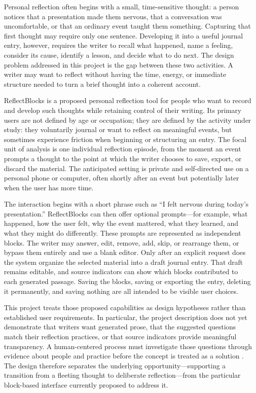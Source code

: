 \documentclass[sigconf,nonacm]{acmart}
\begin{document}
Personal reflection often begins with a small, time-sensitive thought: a person
notices that a presentation made them nervous, that a conversation was
uncomfortable, or that an ordinary event taught them something. Capturing that
first thought may require only one sentence. Developing it into a useful journal
entry, however, requires the writer to recall what happened, name a feeling,
consider its cause, identify a lesson, and decide what to do next. The design
problem addressed in this project is the gap between these two activities. A
writer may want to reflect without having the time, energy, or immediate
structure needed to turn a brief thought into a coherent account.

ReflectBlocks is a proposed personal reflection tool for people who want to
record and develop such thoughts while retaining control of their writing. Its
primary users are not defined by age or occupation; they are defined by the
activity under study: they voluntarily journal or want to reflect on meaningful
events, but sometimes experience friction when beginning or structuring an
entry. The focal unit of analysis is one individual reflection episode, from
the moment an event prompts a thought to the point at which the writer chooses
to save, export, or discard the material. The anticipated setting is private
and self-directed use on a personal phone or computer, often shortly after an
event but potentially later when the user has more time.

The interaction begins with a short phrase such as ``I felt nervous during
today's presentation.'' ReflectBlocks can then offer optional prompts---for
example, what happened, how the user felt, why the event mattered, what they
learned, and what they might do differently. These prompts are represented as
independent blocks. The writer may answer, edit, remove, add, skip, or rearrange
them, or bypass them entirely and use a blank editor. Only after an explicit
request does the system organize the selected material into a draft journal
entry. That draft remains editable, and source indicators can show which blocks
contributed to each generated passage. Saving the blocks, saving or exporting
the entry, deleting it permanently, and saving nothing are all intended to be
visible user choices.

This project treats those proposed capabilities as design hypotheses rather
than established user requirements. In particular, the project description
does not yet demonstrate that writers want generated prose, that the suggested
questions match their reflection practices, or that source indicators provide
meaningful transparency. A human-centered process must investigate those
questions through evidence about people and practice before the concept is
treated as a solution \cite{preece2023interaction}. The design therefore
separates the underlying opportunity---supporting a transition from a fleeting
thought to deliberate reflection---from the particular block-based interface
currently proposed to address it.
\end{document}

